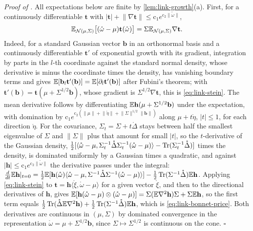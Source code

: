 \noindent\emph{Proof of .}
All expectations below are finite by \cref{lem:link-growth}(a). First, for a continuously differentiable
$\mathbf t$ with $\lvert\mathbf t\rvert+\lVert\nabla\mathbf t\rVert\leq\mathrm c_1e^{\mathrm c_2\lVert\mathring\omega\rVert}$,
\begin{equation}
\mathbb E_{\mathcal N(\mu,\Sigma)}\bigl[(\mathring\omega-\mu)\mathbf t(\mathring\omega)\bigr]=\Sigma\mathbb E_{\mathcal N(\mu,\Sigma)}\nabla\mathbf t.
\label{eq:link-stein}
\end{equation}
Indeed, for a standard Gaussian vector $\mathbf b$ in an orthonormal basis and a continuously
differentiable $\mathbf t'$ of exponential growth with its gradient, integration by parts in the $l$-th
coordinate against the standard normal density, whose derivative is minus the coordinate times the density,
has vanishing boundary terms and gives $\mathbb E[\mathbf b_l\mathbf t'(\mathbf b)]=\mathbb E[\partial_l\mathbf t'(\mathbf b)]$
after Fubini's theorem; with $\mathbf t'(\mathbf b)=\mathbf t(\mu+\Sigma^{1/2}\mathbf b)$, whose gradient is
$\Sigma^{1/2}\nabla\mathbf t$, this is \eqref{eq:link-stein}. The mean derivative follows by differentiating
$\mathbb E\mathbf h(\mu+\Sigma^{1/2}\mathbf b)$ under the expectation, with domination by
$\mathrm c_1e^{\mathrm c_2(\lVert\mu\rVert+\lVert\mathring\eta\rVert+\lVert\Sigma\rVert^{1/2}\lVert\mathbf b\rVert)}$ along
$\mu+t\mathring\eta$, $\lvert t\rvert\leq1$, for each direction $\mathring\eta$. For the covariance, $\Sigma_t=\Sigma+t\mathring\Delta$ stays between half the
smallest eigenvalue of $\Sigma$ and $\lVert\Sigma\rVert$ plus that amount for small $\lvert t\rvert$, so the
$t$-derivative of the Gaussian density,
$\frac12[\langle\mathring\omega-\mu,\Sigma_t^{-1}\mathring\Delta\Sigma_t^{-1}(\mathring\omega-\mu)\rangle-\operatorname{Tr}(\Sigma_t^{-1}\mathring\Delta)]$
times the density, is dominated uniformly by a Gaussian times a quadratic, and against
$\lvert\mathbf h\rvert\leq\mathrm c_1e^{\mathrm c_2\lVert\mathring\omega\rVert}$ the derivative passes under the integral:
$\frac{d}{dt}\mathbb E\mathbf h|_{t=0}=\frac12\mathbb E[\mathbf h(\mathring\omega)\langle\mathring\omega-\mu,\Sigma^{-1}\mathring\Delta\Sigma^{-1}(\mathring\omega-\mu)\rangle]-\frac12\operatorname{Tr}(\Sigma^{-1}\mathring\Delta)\mathbb E\mathbf h$.
Applying \eqref{eq:link-stein} to $\mathbf t=\mathbf h\langle\mathring\xi,\mathring\omega-\mu\rangle$ for a given
vector $\mathring\xi$, and then to the directional derivatives of $\mathbf h$, gives
$\mathbb E[\mathbf h(\mathring\omega-\mu)\otimes(\mathring\omega-\mu)]=\Sigma(\mathbb E\nabla^2\mathbf h)\Sigma+\Sigma\mathbb E\mathbf h$,
so the first term equals $\frac12\operatorname{Tr}(\mathring\Delta\mathbb E\nabla^2\mathbf h)+\frac12\operatorname{Tr}(\Sigma^{-1}\mathring\Delta)\mathbb E\mathbf h$, which is
\eqref{eq:link-bonnet-price}. Both derivatives are continuous in $(\mu,\Sigma)$ by dominated convergence in
the representation $\mathring\omega=\mu+\Sigma^{1/2}\mathbf b$, since $\Sigma\mapsto\Sigma^{1/2}$ is continuous on
the cone. \hfill$\square$

